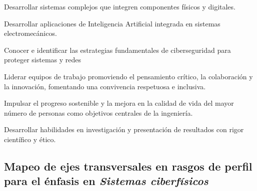 \begin{cuadroazul}[SCF05]
Desarrollar sistemas complejos que integren componentes físicos y digitales.
\end{cuadroazul}

\begin{cuadroazul}[SCF06]
Desarrollar aplicaciones de Inteligencia Artificial integrada en sistemas electromecánicos.
\end{cuadroazul}

\begin{cuadroazul}[SCF07]
Conocer e identificar las estrategias fundamentales de ciberseguridad para proteger sistemas y redes
\end{cuadroazul}

\begin{cuadroazul}[LID01]
Liderar equipos de trabajo promoviendo el pensamiento crítico, la colaboración y la innovación, fomentando una convivencia respetuosa e inclusiva.
\end{cuadroazul}

\begin{cuadroazul}[SYC01]
Impulsar el progreso sostenible y la mejora en la calidad de vida del mayor número de personas como objetivos centrales de la ingeniería.
\end{cuadroazul}

\begin{cuadroazul}[IPR01]
Desarrollar habilidades en investigación y presentación de resultados con rigor científico y ético.
\end{cuadroazul}

\subsection*{Mapeo de ejes transversales en rasgos de perfil para el énfasis en \textit{Sistemas ciberfísicos}}


